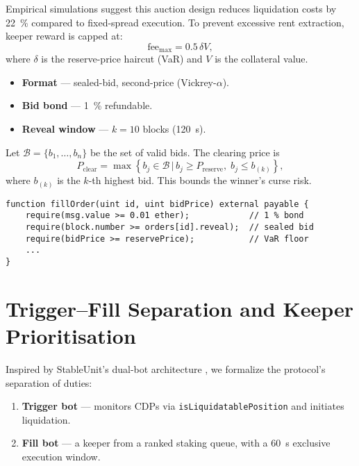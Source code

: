 \documentclass[11pt]{article}
\begin{document}
Empirical simulations suggest this auction design reduces liquidation costs by \SI{22}{\percent} compared to fixed-spread execution. To prevent excessive rent extraction, keeper reward is capped at:
\[
\text{fee}_{\max} = 0.5\,\delta V,
\]
where \( \delta \) is the reserve-price haircut (VaR) and \( V \) is the collateral value.

\begin{itemize}[leftmargin=*]
  \item \textbf{Format} — sealed-bid, second-price (Vickrey-$\alpha$).
  \item \textbf{Bid bond} — \SI{1}{\percent} refundable.
  \item \textbf{Reveal window} — $k{=}10$ blocks (\SI{120}{\second}).
\end{itemize}

Let $\mathcal{B} = \{b_1, \dots, b_n\}$ be the set of valid bids. The clearing price is
\[
P_{\text{clear}} = \max\left\{ b_j \in \mathcal{B} \,|\, b_j \geq P_{\text{reserve}},\; b_j \leq b_{(k)} \right\},
\]
where $b_{(k)}$ is the $k$-th highest bid. This bounds the winner's curse risk.

\begin{listing}[htbp]
\begin{lstlisting}[caption={Solidity pseudo-code: auction guard}]
function fillOrder(uint id, uint bidPrice) external payable {
    require(msg.value >= 0.01 ether);            // 1 % bond
    require(block.number >= orders[id].reveal);  // sealed bid
    require(bidPrice >= reservePrice);           // VaR floor
    ...
}
\end{lstlisting}
\end{listing}

\section{Trigger–Fill Separation and Keeper Prioritisation}
\label{sec:bots}
Inspired by StableUnit’s dual-bot architecture \parencite{stableunit2025spec}, we formalize the protocol's separation of duties:

\begin{enumerate}[label=\textbf{\arabic*.},wide, labelindent=0pt]
  \item \textbf{Trigger bot} — monitors CDPs via \texttt{isLiquidatablePosition} and initiates liquidation.
  \item \textbf{Fill bot} — a keeper from a ranked staking queue, with a \SI{60}{\second} exclusive execution window.
\end{enumerate}
\end{document}
